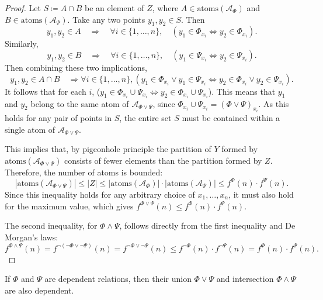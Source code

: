 \begin{proof}
    Let $S \coloneq A \cap B$ be an element of $Z$, where $A \in \text{atoms}(\mathcal{A}_\Phi)$ and $B \in \text{atoms}(\mathcal{A}_\Psi)$. Take any two points $y_1, y_2 \in S$. Then
    \[
        y_1, y_2 \in A \quad \Rightarrow \quad \forall i \in \{1, \dots, n\}, \quad (y_1 \in \Phi_{x_i} \iff y_2 \in \Phi_{x_i}).
    \]
    Similarly,
    \[
        y_1, y_2 \in B \quad \Rightarrow \quad \forall i \in \{1, \dots, n\}, \quad (y_1 \in \Psi_{x_i} \iff y_2 \in \Psi_{x_i}).
    \]
    Then combining these two implications,
    \[
        y_1, y_2 \in A \cap B \quad \Rightarrow \forall i \in \{1, \dots, n\}, (y_1 \in \Phi_{x_i} \lor y_1 \in \Psi_{x_i} \iff y_2 \in \Phi_{x_i} \lor y_2 \in \Psi_{x_i}).
    \]
    It follows that for each $i$, ($y_1 \in \Phi_{x_i} \cup \Psi_{x_i} \iff y_2 \in \Phi_{x_i} \cup \Psi_{x_i}$). This means that $y_1$ and $y_2$ belong to the same atom of $\mathcal{A}_{\Phi \lor \Psi}$, since $\Phi_{x_i} \cup \Psi_{x_i} = (\Phi \lor \Psi)_{x_i}$. As this holds for any pair of points in $S$, the entire set $S$ must be contained within a single atom of $\mathcal{A}_{\Phi \lor \Psi}$.

    This implies that, by pigeonhole principle the partition of $Y$ formed by $\text{atoms}(\mathcal{A}_{\Phi \lor \Psi})$ consists of fewer elements than the partition formed by $Z$. Therefore, the number of atoms is bounded:
    \[
        |\text{atoms}(\mathcal{A}_{\Phi \lor \Psi})| \leq |Z| \leq |\text{atoms}(\mathcal{A}_\Phi)| \cdot |\text{atoms}(\mathcal{A}_\Psi)| \le f^\Phi(n) \cdot f^\Psi(n).
    \]
    Since this inequality holds for any arbitrary choice of $x_1, \dots, x_n$, it must also hold for the maximum value, which gives $f^{\Phi \lor \Psi}(n) \le f^\Phi(n) \cdot f^\Psi(n)$.

    The second inequality, for $\Phi  \land  \Psi$, follows directly from the first inequality and De Morgan's laws:
    \[
        f^{\Phi \land  \Psi}(n) = f^{\neg(\neg\Phi \lor \neg\Psi)}(n) = f^{\neg\Phi \lor \neg\Psi}(n) \le f^{\neg\Phi}(n) \cdot f^{\neg\Psi}(n) = f^\Phi(n) \cdot f^\Psi(n).
    \]
\end{proof}

\begin{lemma}{\label{lem:dependent-union-intersection}}
    If $\Phi$ and $\Psi$ are dependent relations, then their union $\Phi \lor \Psi$ and intersection $\Phi \land  \Psi$ are also dependent.
\end{lemma}

